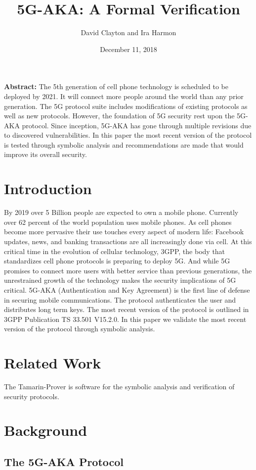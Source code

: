 \documentclass[11pt, pdftex]{article}
\title{5G-AKA: A Formal Verification}
\author{David Clayton and Ira Harmon}
\date{December 11, 2018}
\begin{document}
\maketitle
\textbf{Abstract:} 
The 5th generation of cell phone technology is scheduled to be deployed by 2021.  It will connect more people around the world than any prior generation.  The 5G protocol suite includes modifications of existing protocols as well as new protocols.  However, the foundation of 5G security rest upon the 5G-AKA protocol.  Since inception, 5G-AKA has gone through multiple revisions due to discovered vulnerabilities.  In this paper the most recent version of the protocol is tested through symbolic analysis and recommendations are made that would improve its overall security.

\newpage
\section{Introduction}
By 2019 over 5 Billion people are expected to own a mobile phone.  Currently over 62 percent of the world population uses mobile phones.  As cell phones become more pervasive their use touches every aspect of modern life: Facebook updates, news, and banking transactions are all increasingly done via cell.  At this critical time in the evolution of cellular technology, 3GPP, the body that standardizes cell phone protocols is preparing to deploy 5G.  And while 5G promises to connect more users with better service than previous generations, the unrestrained growth of the technology makes the security implications of 5G critical.  5G-AKA (Authentication and Key Agreement) is the first line of defense in securing mobile communications.  The protocol authenticates the user and distributes long term keys.  The most recent version of the protocol is outlined in 3GPP Publication TS 33.501 V15.2.0.  In this paper we validate the most recent version of the protocol through symbolic analysis.  

\section{Related Work}
The Tamarin-Prover is software for the symbolic analysis and verification of security protocols.


\section{Background}
\subsection{The 5G-AKA Protocol}
\end{document}
